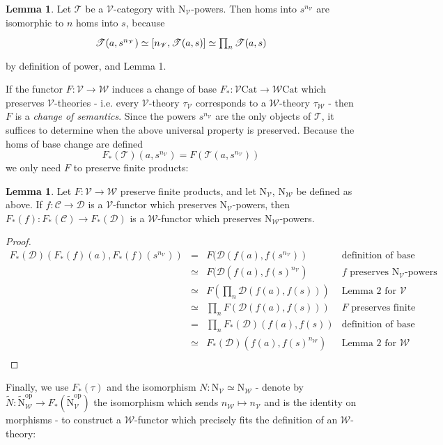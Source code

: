 \documentclass[a4paper,UKenglish]{article}
\theoremstyle{definition}
\newtheorem{lemma}[theorem]{Lemma}
\newcommand{\Cat}{\mathrm{Cat}}
\newcommand{\op}{\mathrm{op}}
\newcommand{\NN}{\mathrm{N}}
\newcommand{\V}{\mathscr{V}}
\newcommand{\W}{\mathscr{W}}
\newcommand{\D}{\mathscr{D}}
\newcommand{\C}{\mathscr{C}}
\newcommand{\T}{\mathscr{T}}
\begin{document}
\begin{lemma}
	Let $\T$ be a $\V$-category with $\NN_\V$-powers. Then homs into $s^{n_\V}$ are isomorphic to $n$ homs into $s$, because \[\begin{tikzcd} \T(a,s^{n_\V}) \simeq [n_\V,\T(a,s)] \simeq \prod_n \T(a,s) \end{tikzcd}\] by definition of power, and Lemma 1.
\end{lemma}

If the functor $F:\V \to \W$ induces a change of base $F_*:\V\Cat \to \W\Cat$ which preserves $\V$-theories - i.e. every $\V$-theory $\tau_\V$ corresponds to a $\W$-theory $\tau_\W$ - then $F$ is a \textit{change of semantics}. Since the powers $s^{n_\V}$ are the only objects of $\T$, it suffices to determine when the above universal property is preserved. Because the homs of base change are defined $$F_*(\T)(a,s^{n_\V}) = F(\T(a,s^{n_\V}))$$ we only need $F$ to preserve finite products:

\begin{lemma}
	Let $F: \V \to \W$ preserve finite products, and let $\NN_\V$, $\NN_\W$ be defined as above. If $f: \C \to \D$ is a $\V$-functor which preserves $\NN_\V$-powers, then $F_*(f):F_*(\C)\to F_*(\D)$ is a $\W$-functor which preserves $\NN_\W$-powers.
\end{lemma}
\begin{proof}
	\[\begin{array}{rcll}
	F_*(\D)(F_*(f)(a),F_*(f)(s^{n_\V})) & = & F(\D(f(a),f(s^{n_\V})) & \text{definition of base change}\\
	& \simeq & F(\D(f(a),f(s)^{n_\V}) & f \text{ preserves } \NN_\V \text{-powers}\\
	& \simeq & F(\prod_n \D(f(a),f(s))) & \text{Lemma 2 for } \V\\
	& \simeq & \prod_n F(\D(f(a),f(s))) & F \text{ preserves finite products}\\
	& = & \prod_n F_*(\D)(f(a),f(s)) & \text{definition of base change}\\
	& \simeq & F_*(\D)(f(a),f(s)^{n_\W}) & \text{Lemma 2 for } \W\\
	\end{array}\]
\end{proof}

Finally, we use $F_*(\tau)$ and the isomorphism $N: \NN_\V \simeq \NN_\W$ - denote by $\tilde{N}: \tilde{\NN}_\W^\op \to F_*(\tilde{\NN}_\V^\op)$ the isomorphism which sends $n_\W \mapsto n_\V$ and is the identity on morphisms - to construct a $\W$-functor which precisely fits the definition of an $\W$-theory:
\end{document}
